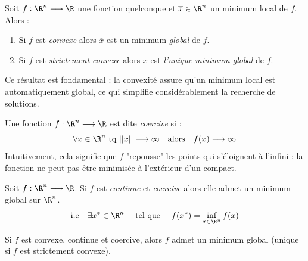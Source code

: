 \begin{theorem}
    Soit $f : \R^n \longrightarrow \R$ une fonction quelconque et $ \overline{x} \in \R^n $ un minimum 
    local de $f$. Alors : 
    \begin{enumerate}
        \item Si $f$ est \emph{convexe} alors $ \overline{x}$ est un minimum \emph{global} de $f$. 
        \item Si $f$ est \emph{strictement convexe} alors $ \overline{x}$ est \emph{l'unique minimum global} de $f$. 
    \end{enumerate}
\end{theorem}

Ce résultat est fondamental : la convexité assure qu’un minimum local est automatiquement global, ce qui simplifie 
considérablement la recherche de solutions.

\begin{definition}
    Une fonction $f : \R^n \longrightarrow \R$ est dite \emph{coercive} si : 
        \begin{equation}\label{eq:def-coercive}
            \forall x \in \R^n \text{ tq } || x || \longrightarrow \infty \quad \text{alors} \quad f(x) \longrightarrow \infty
        \end{equation}
    Intuitivement, cela signifie que $f$ "repousse" les points qui s’éloignent à l’infini : la fonction ne peut pas 
    être minimisée à l’extérieur d’un compact.
\end{definition}

\begin{theorem}[Weierstrass]
    Soit $f : \R^n \longrightarrow \R$. Si $f$ est \emph{continue} et \emph{coercive} alors elle admet un 
    minimum global sur $\R^n$.
        \begin{equation}\label{eq:weierstrass-theorem}
            \text{i.e} \quad \exists x^* \in \R^n \quad \text{ tel que } \quad f(x^*) = \inf_{x \in \R^n}f(x)
        \end{equation}
\end{theorem}

\begin{corollary}
    Si $f$ est convexe, continue et coercive, alors $f$ admet un minimum global (unique si $f$ est strictement convexe).
\end{corollary}


